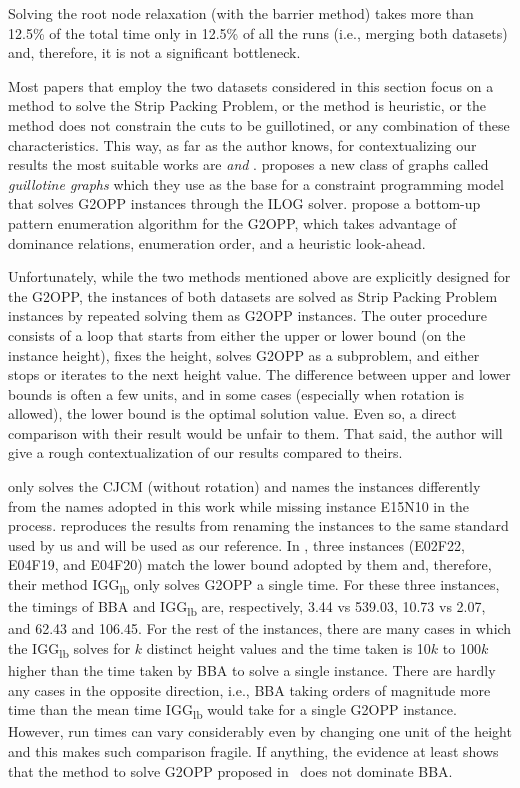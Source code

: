 Solving the root node relaxation (with the barrier method) takes more than 12.5\% of the total time only in 12.5\% of all the runs (i.e., merging both datasets) and, therefore, it is not a significant bottleneck.

Most papers that employ the two datasets considered in this section focus on a method to solve the Strip Packing Problem, or the method is heuristic, or the method does not constrain the cuts to be guillotined, or any combination of these characteristics.
This way, as far as the author knows, for contextualizing our results the most suitable works are \citet{clautiaux:2011} \emph{and} \citet{fleszar:2016}.
\citet{clautiaux:2011} proposes a new class of graphs called \emph{guillotine graphs} which they use as the base for a constraint programming model that solves G2OPP instances through the ILOG solver.
\citet{fleszar:2016} propose a bottom-up pattern enumeration algorithm for the G2OPP, which takes advantage of dominance relations, enumeration order, and a heuristic look-ahead.

Unfortunately, while the two methods mentioned above are explicitly designed for the G2OPP, the instances of both datasets are solved as Strip Packing Problem instances by repeated solving them as G2OPP instances.
The outer procedure consists of a loop that starts from either the upper or lower bound (on the instance height), fixes the height, solves G2OPP as a subproblem, and either stops or iterates to the next height value.
The difference between upper and lower bounds is often a few units, and in some cases (especially when rotation is allowed), the lower bound is the optimal solution value.
Even so, a direct comparison with their result would be unfair to them.
That said, the author will give a rough contextualization of our results compared to theirs.

\citet{clautiaux:2011} only solves the CJCM (without rotation) and names the instances differently from the names adopted in this work while missing instance E15N10 in the process. \citet{fleszar:2016} reproduces the results from \citet{clautiaux:2011} renaming the instances to the same standard used by us and will be used as our reference.
In \citet{clautiaux:2011}, three instances (E02F22, E04F19, and E04F20) match the lower bound adopted by them and, therefore, their method IGG\textsubscript{lb} only solves G2OPP a single time.
For these three instances, the timings of BBA and IGG\textsubscript{lb} are, respectively, 3.44 vs 539.03, 10.73 vs 2.07, and 62.43 and 106.45.
For the rest of the instances, there are many cases in which the IGG\textsubscript{lb} solves for \(k\) distinct height values and the time taken is 10\(k\) to 100\(k\) higher than the time taken by BBA to solve a single instance.
There are hardly any cases in the opposite direction, i.e., BBA taking orders of magnitude more time than the mean time IGG\textsubscript{lb} would take for a single G2OPP instance.
However, run times can vary considerably even by changing one unit of the height and this makes such comparison fragile.
If anything, the evidence at least shows that the method to solve G2OPP proposed in~\citet{clautiaux:2011} does not dominate BBA.

